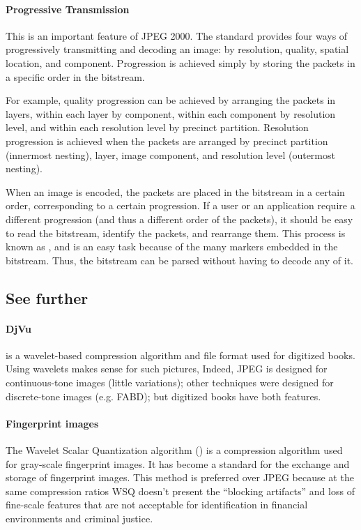 \documentclass[a4paper, 11pt, openany]{book}
\begin{document}
\paragraph{Progressive Transmission}
This is an important feature of JPEG 2000. The
standard provides four ways of progressively transmitting and decoding an image: by
resolution, quality, spatial location, and component. Progression is achieved simply
by storing the packets in a specific order in the bitstream.

For example, quality  progression can be achieved by arranging the packets in layers, within each layer by component, within each component by resolution level, and within each resolution level by precinct partition. Resolution progression is achieved when the packets are arranged by precinct partition (innermost nesting), layer, image component, and resolution level (outermost nesting).

When an image is encoded, the packets are placed in the bitstream in a certain order, corresponding to a certain progression. If a user or an application require a different progression (and thus a different order of the packets), it should be easy to read the bitstream, identify the packets, and rearrange them. This process is known as , and is an easy task because of the many markers embedded in the bitstream. Thus, the bitstream can be parsed without having to decode
any of it.




\subsection{See further}

\paragraph{DjVu}
 is a wavelet-based compression algorithm and file format used for digitized books. Using wavelets makes sense for such pictures, Indeed, JPEG is designed for continuous-tone images (little variations); other techniques were designed for discrete-tone images (e.g. FABD); but digitized books have both features.

\paragraph{Fingerprint images}
The Wavelet Scalar Quantization algorithm () is a compression algorithm used for gray-scale fingerprint images. It has become a standard for the exchange and storage of fingerprint images. This method is preferred over JPEG because at the same compression ratios WSQ doesn't present the ``blocking artifacts'' and loss of fine-scale features that are not acceptable for identification in financial environments and criminal justice.
\end{document}
